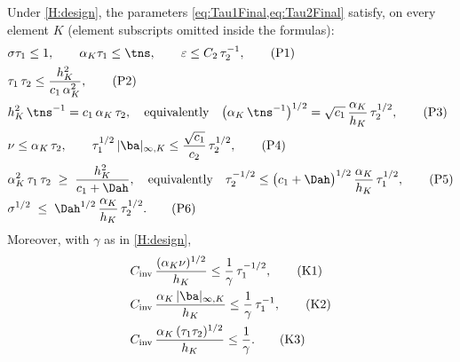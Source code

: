 \begin{lemma}
\label{oa:lem:parameters}
Under \cref{H:design}, the parameters \cref{eq:Tau1Final,eq:Tau2Final} satisfy, on every element $K$
(element subscripts omitted inside the formulas):
\begin{align}
  &\sigma\tau_1 \le 1,
  \qquad
  \alpha_K \tau_1 \le \tns,
  \qquad
  \varepsilon \le C_2\, \tau_2^{-1},
  \tag{P1}\label{oa:eq:P1}\\
  &\tau_1\,\tau_2 \le \frac{h_K^2}{c_1\,\alpha_K^2},
  \tag{P2}\label{oa:eq:P2}\\
  &h_K^2\,\tns^{-1} = c_1\,\alpha_K\,\tau_2,
  \quad\text{equivalently}\quad
  \bigl(\alpha_K\,\tns^{-1}\bigr)^{1/2} = \sqrt{c_1}\,\frac{\alpha_K}{h_K}\,\tau_2^{1/2},
  \tag{P3}\label{oa:eq:P3}\\
  &\nu \le \alpha_K\,\tau_2,
  \qquad
  \tau_1^{1/2}\,|\ba|_{\infty,K} \le \frac{\sqrt{c_1}}{c_2}\,\tau_2^{1/2},
  \tag{P4}\label{oa:eq:P4}\\
  &\alpha_K^2\,\tau_1\,\tau_2 \;\ge\; \frac{h_K^2}{c_1 + \Dah},
  \quad\text{equivalently}\quad
  \tau_2^{-1/2} \le \bigl(c_1 + \Dah\bigr)^{1/2}\,\frac{\alpha_K}{h_K}\,\tau_1^{1/2},
  \tag{P5}\label{oa:eq:P5}\\
  &\sigma^{1/2} \;\le\; \Dah^{1/2}\,\frac{\alpha_K}{h_K}\,\tau_2^{1/2}.
  \tag{P6}\label{oa:eq:P6}
\end{align}
Moreover, with $\gamma$ as in \cref{H:design},
\begin{align}
  &C_{\mathrm{inv}}\,\frac{(\alpha_K\nu)^{1/2}}{h_K} \le \frac{1}{\gamma}\,\tau_1^{-1/2},
  \tag{K1}\label{oa:eq:K1}\\
  &C_{\mathrm{inv}}\,\frac{\alpha_K\,|\ba|_{\infty,K}}{h_K} \le \frac{1}{\gamma}\,\tau_1^{-1},
  \tag{K2}\label{oa:eq:K2}\\
  &C_{\mathrm{inv}}\,\frac{\alpha_K\,(\tau_1\tau_2)^{1/2}}{h_K} \le \frac{1}{\gamma}.
  \tag{K3}\label{oa:eq:K3}
\end{align}
\end{lemma}

